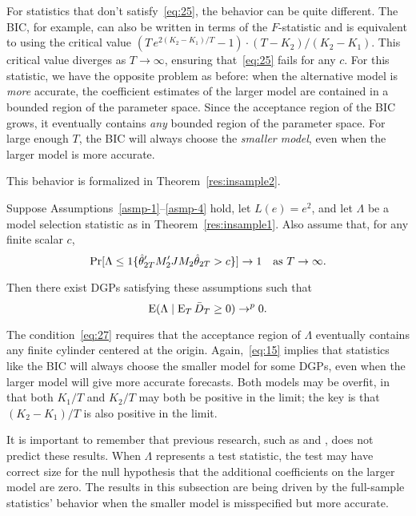 \documentclass[12pt,draft]{article}
\begin{document}
For statistics that don't satisfy~\eqref{eq:25}, the behavior can be
quite different. The BIC, for example, can also be written in terms of
the $F$-statistic and is equivalent to using the critical value $(T \,
e^{2 (K_2 - K_1) / T} - 1) \cdot (T - K_2) / (K_2 - K_1)$. This
critical value diverges as $T \to \infty$, ensuring that~\eqref{eq:25}
fails for any $c$. For this statistic, we have the opposite problem as
before: when the alternative model is \emph{more} accurate, the
coefficient estimates of the larger model are contained in a bounded
region of the parameter space. Since the acceptance region of the BIC
grows, it eventually contains \emph{any} bounded region of the
parameter space. For large enough $T$, the BIC will always choose the
\emph{smaller model}, even when the larger model is more accurate.

This behavior is formalized in Theorem~\ref{res:insample2}.
\begin{thm}\label{res:insample2}
  Suppose Assumptions~\ref{asmp-1}--\ref{asmp-4} hold, let $L(e) =
  e^2$, and let $\Lambda$ be a model selection statistic as in
  Theorem~\ref{res:insample1}. Also assume that, for any finite scalar
  $c$,
  \begin{equation}\label{eq:27}
    \Pr[\Lambda \leq \operatorname{1}\{\hat\theta_{2T}'M_2'J M_2\hat\theta_{2T} > c \}] \to 1
    \quad \text{as } T \to \infty.
  \end{equation}

  Then there exist DGPs satisfying these assumptions such that
  \begin{equation}\label{eq:15}
    \operatorname{E}( \Lambda \mid \operatorname{E}_T \bar{D}_{T} \geq 0 ) \to^p 0.
  \end{equation}
\end{thm}

The condition~\eqref{eq:27} requires that the acceptance region of
$\Lambda$ eventually contains any finite cylinder centered at the
origin. Again,~\eqref{eq:15} implies that statistics like the BIC
will always choose the smaller model for some DGPs, even when the
larger model will give more accurate forecasts. Both models may be
overfit, in that both $K_1/T$ and $K_2/T$ may both be positive in the
limit; the key is that $(K_2 - K_1)/T$ is also positive in the limit.

It is important to remember that previous research, such as
\citet{Cal:11c} and \citet{Ana:12}, does not predict these
results. When $\Lambda$ represents a test statistic, the test may have
correct size for the null hypothesis that the additional coefficients
on the larger model are zero. The results in this subsection are being
driven by the full-sample statistics' behavior when the smaller model
is misspecified but more accurate.
\end{document}
